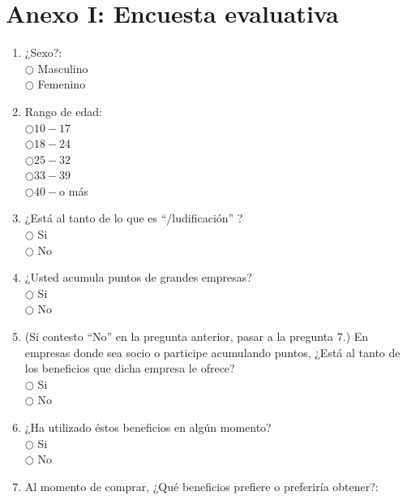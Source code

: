 \section{Anexo I: Encuesta evaluativa}
\label{AnexoI}
\begin{enumerate}

\item ¿Sexo?: \\

$\bigcirc$ Masculino \\
$\bigcirc$ Femenino

\item Rango de edad: \\

$\bigcirc 10 - 17$\\
$\bigcirc 18 - 24$\\
$\bigcirc 25 - 32$\\
$\bigcirc 33 - 39$\\
$\bigcirc 40 - $o más

\item ¿Está al tanto de lo que es ``{\gam}/ludificación'' ? \\

$\bigcirc$ Si \\
$\bigcirc$ No

\item ¿Usted acumula puntos de grandes empresas?\\

$\bigcirc$ Si \\
$\bigcirc$ No    

\item  (Si contesto ``No'' en la pregunta anterior, pasar a la pregunta 7.) En empresas donde sea socio o participe acumulando puntos, ¿Está al tanto de los beneficios que dicha empresa le ofrece?\\

$\bigcirc$ Si \\
$\bigcirc$ No

\item ¿Ha utilizado éstos beneficios en algún momento?\\

$\bigcirc$ Si \\
$\bigcirc$ No

\item Al momento de comprar, ¿Qué beneficios prefiere o preferiría obtener?:


\end{enumerate}
